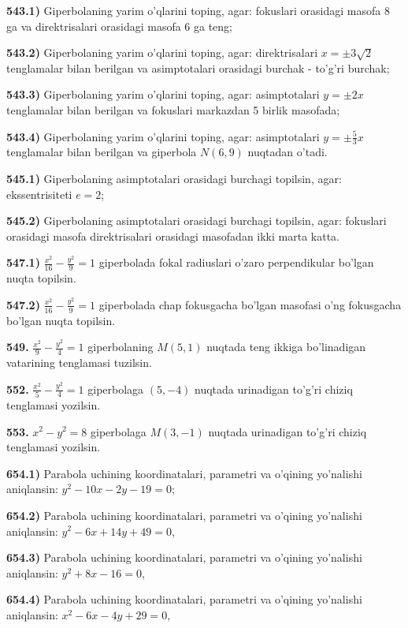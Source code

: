 \textbf{543.1)} Giperbolaning yarim o'qlarini toping, agar: fokuslari orasidagi masofa 8 ga va direktrisalari orasidagi masofa 6 ga teng;

\textbf{543.2)} Giperbolaning yarim o'qlarini toping, agar: direktrisalari \(x = \pm 3\sqrt{2}\) tenglamalar bilan berilgan va asimptotalari orasidagi burchak - to'g'ri burchak;

\textbf{543.3)} Giperbolaning yarim o'qlarini toping, agar: asimptotalari \(y = \pm 2x\) tenglamalar bilan berilgan va fokuslari markazdan 5 birlik masofada;

\textbf{543.4)} Giperbolaning yarim o'qlarini toping, agar: asimptotalari \(y = \pm \frac{5}{3}x\) tenglamalar bilan berilgan va giperbola \(N(6,9)\) nuqtadan o'tadi.

\textbf{545.1)} Giperbolaning asimptotalari orasidagi burchagi topilsin, agar: ekssentrisiteti \(e = 2\);

\textbf{545.2)} Giperbolaning asimptotalari orasidagi burchagi topilsin, agar: fokuslari orasidagi masofa direktrisalari orasidagi masofadan ikki marta katta.

\textbf{547.1)} \(\frac{x^{2}}{16} - \frac{y^{2}}{9} = 1\) giperbolada fokal radiuslari o'zaro perpendikular bo'lgan nuqta topilsin.

\textbf{547.2)} \(\frac{x^{2}}{16} - \frac{y^{2}}{9} = 1\) giperbolada chap fokusgacha bo'lgan masofasi o'ng fokusgacha bo'lgan nuqta topilsin.

\textbf{549.} \(\frac{x^{2}}{9} - \frac{y^{2}}{4} = 1\) giperbolaning \(M(5,1)\) nuqtada teng ikkiga bo'linadigan vatarining tenglamasi tuzilsin.

\textbf{552.} \(\frac{x^{2}}{5} - \frac{y^{2}}{4} = 1\) giperbolaga \((5, - 4)\) nuqtada urinadigan to'g'ri chiziq tenglamasi yozilsin.

\textbf{553.} \(x^{2} - y^{2} = 8\) giperbolaga \(M(3, - 1)\) nuqtada urinadigan to'g'ri chiziq tenglamasi yozilsin.

\textbf{654.1)} Parabola uchining koordinatalari, parametri va o'qining yo'nalishi aniqlansin: \(y^{2} - 10x - 2y - 19 = 0\);

\textbf{654.2)} Parabola uchining koordinatalari, parametri va o'qining yo'nalishi aniqlansin: \(y^{2} - 6x + 14y + 49 = 0\),

\textbf{654.3)} Parabola uchining koordinatalari, parametri va o'qining yo'nalishi aniqlansin: \(y^{2} + 8x - 16 = 0\),

\textbf{654.4)} Parabola uchining koordinatalari, parametri va o'qining yo'nalishi aniqlansin: \(x^{2} - 6x - 4y + 29 = 0\),

